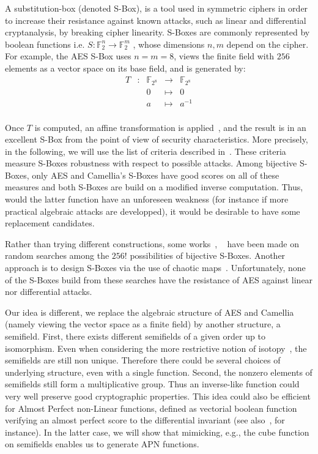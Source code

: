 \documentclass{article}\usepackage{amsthm}
\newcommand{\SBox}{S-Box\xspace}
\newcommand{\SBoxes}{S-Boxes\xspace}
\begin{document}
A substitution-box (denoted \SBox), is a tool used in
symmetric ciphers in order to increase their resistance against known
attacks, such as linear and differential cryptanalysis, by breaking cipher linearity.
\SBoxes are commonly represented by boolean functions i.e. $ S : \mathbb{F}_2^n
\to \mathbb{F}_2^m $ , whose dimensions $n,m$ depend on the cipher. 
For example, the AES \SBox uses $n=m=8$, views the finite field with $256$
elements as a vector space on its base field, and is generated by: 
\begin{equation}\label{eq:aes}\begin{array}{ccccc}
	T & : & \mathbb{F}_{2^8} & \to & \mathbb{F}_{2^8} \\
	& & 0 & \mapsto & 0 \\
	& & a & \mapsto & a^{-1} \\
\end{array}
\end{equation}

Once $T$ is computed, an affine transformation is
applied~\cite{Daemen:1998:rijndael}, and the result is in an excellent \SBox
from the point 
of view of security characteristics. More precisely, in the following, we will
use the list of criteria described in~\cite{Alvarez:2008:apn}. 
These criteria measure \SBoxes robustness with respect to possible attacks.
Among bijective \SBoxes, only AES and Camellia's \SBoxes have good scores on all
of these measures and both \SBoxes are build on a modified inverse computation.
Thus, would the latter function have an unforeseen weakness (for instance if
more practical algebraic attacks are developped), it would be desirable to have
some replacement candidates. 


Rather than trying different constructions, some works~\cite{Alvarez:2008:apn},
~\cite{Danjean:2007:pasco}  have been made on random searches among the $256!$
possibilities of bijective \SBoxes. 
Another approach is to design \SBoxes via the use of chaotic
maps~\cite{Hussain:2012:chaotic}.
Unfortunately, none of the \SBoxes build from these searches have the resistance
of AES against linear nor differential attacks.

Our idea is different, we replace the algebraic structure of AES and Camellia
(namely viewing the vector space as a finite field) by another structure, a
semifield. 
First, there exists different semifields of a given order up to isomorphism. 
Even when considering the more restrictive notion of isotopy~\cite{Albert:1960:finite}, the
semifields are still non unique. Therefore there could be several choices of
underlying structure, even with a single function.
Second, the nonzero elements of semifields still form a multiplicative group. 
Thus an inverse-like function could very well preserve good cryptographic
properties.
This idea could also be efficient for Almost Perfect non-Linear functions, defined as vectorial boolean function
verifying an almost perfect score to the differential invariant (see
also~\cite{Alvarez:2008:apn}, for instance). In the latter case, we will show that mimicking,
e.g., the cube function on semifields enables us to generate
APN functions.
\end{document}
